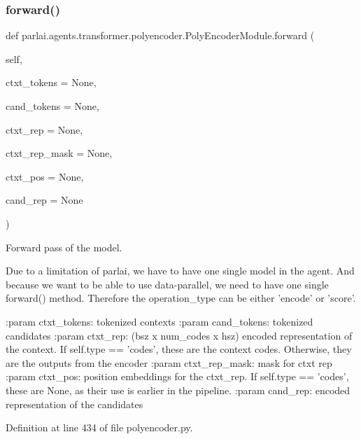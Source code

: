 \subsubsection{\texorpdfstring{forward()}{forward()}}
{\footnotesize\ttfamily def parlai.\+agents.\+transformer.\+polyencoder.\+Poly\+Encoder\+Module.\+forward (\begin{DoxyParamCaption}\item[{}]{self,  }\item[{}]{ctxt\+\_\+tokens = {\ttfamily None},  }\item[{}]{cand\+\_\+tokens = {\ttfamily None},  }\item[{}]{ctxt\+\_\+rep = {\ttfamily None},  }\item[{}]{ctxt\+\_\+rep\+\_\+mask = {\ttfamily None},  }\item[{}]{ctxt\+\_\+pos = {\ttfamily None},  }\item[{}]{cand\+\_\+rep = {\ttfamily None} }\end{DoxyParamCaption})}

\begin{DoxyVerb}Forward pass of the model.

Due to a limitation of parlai, we have to have one single model
in the agent. And because we want to be able to use data-parallel,
we need to have one single forward() method.
Therefore the operation_type can be either 'encode' or 'score'.

:param ctxt_tokens:
    tokenized contexts
:param cand_tokens:
    tokenized candidates
:param ctxt_rep:
    (bsz x num_codes x hsz)
    encoded representation of the context. If self.type == 'codes', these
    are the context codes. Otherwise, they are the outputs from the
    encoder
:param ctxt_rep_mask:
    mask for ctxt rep
:param ctxt_pos:
    position embeddings for the ctxt_rep. If self.type == 'codes', these
    are None, as their use is earlier in the pipeline.
:param cand_rep:
    encoded representation of the candidates
\end{DoxyVerb}
 

Definition at line 434 of file polyencoder.\+py.


